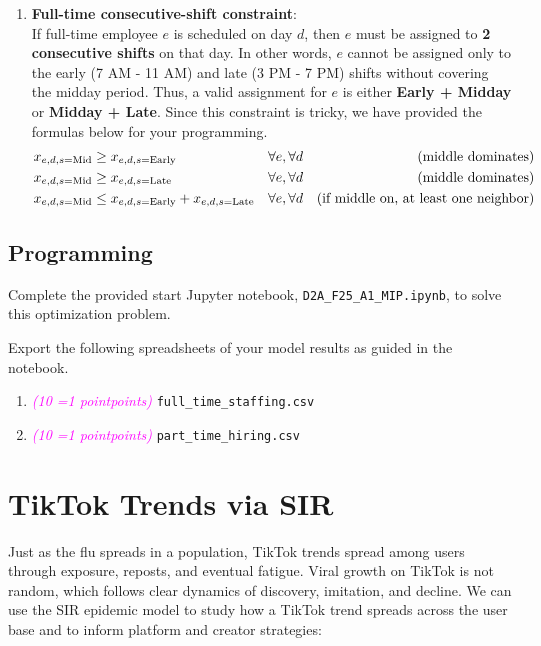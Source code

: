 \documentclass[11pt, letter, answers]{exam}
\newcommand{\grade}[1]{
    \small\textcolor{magenta}{\emph{(#1 \ifnum#1=1 point\else points\fi)}}%
    \normalsize
}
\begin{document}
\begin{enumerate}[label=(\alph*), resume]
\item \textbf{Full-time consecutive-shift constraint}:
\\ If full-time employee $e$ is scheduled on day $d$, then $e$ must be assigned to \textbf{2 consecutive shifts} on that day. In other words, $e$ cannot be assigned only to the early (7 AM - 11 AM) and late (3 PM - 7 PM) shifts without covering the midday period. Thus, a valid assignment for $e$ is either \textbf{Early + Midday} or \textbf{Midday + Late}. Since this constraint is tricky, we have provided the formulas below for your programming.
{
\Large
\begin{align*}
    x_{e, d, s=\text{Mid}} &\ge x_{e, d, s=\text{Early}} & &\forall e ,  \forall d & \text{\normalsize(middle dominates)} 
    \\
    x_{e, d, s=\text{Mid}} &\ge x_{e, d, s=\text{Late}} & &\forall e ,  \forall d & \text{\normalsize(middle dominates)} 
    \\
    x_{e, d, s=\text{Mid}} &\le x_{e, d, s=\text{Early}} + x_{e, d, s=\text{Late}} & &\forall e ,  \forall d & \text{\normalsize(if middle on, at least one neighbor)} 
\end{align*}
}


\end{enumerate}


\vspace{1em}
\subsection{Programming}
Complete the provided start Jupyter notebook, \texttt{D2A\_F25\_A1\_MIP.ipynb}, to solve this optimization problem.

Export the following spreadsheets of your model results as guided in the notebook.

\begin{enumerate}[label=(\alph*)]
    \item \grade{10} \texttt{full\_time\_staffing.csv}
    \item \grade{10} \texttt{part\_time\_hiring.csv}
\end{enumerate}


\vspace{4em}
\section{TikTok Trends via SIR}
\label{sec:a1_sir}
Just as the flu spreads in a population, TikTok trends spread among users through exposure, reposts, and eventual fatigue. Viral growth on TikTok is not random, which follows clear dynamics of discovery, imitation, and decline. We can use the SIR epidemic model to study how a TikTok trend spreads across the user base and to inform platform and creator strategies:
\end{document}

